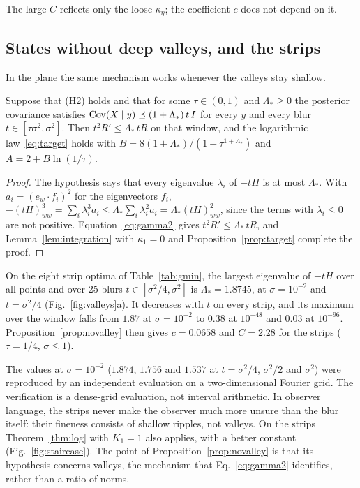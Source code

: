 The large $C$ reflects only the loose $\kappa_\eta$; the coefficient $c$ does not depend on it.

\subsection{States without deep valleys, and the strips}
\label{sec:novalley}

In the plane the same mechanism works whenever the valleys stay shallow.

\begin{proposition}
\label{prop:novalley}
Suppose that (H2) holds and that for some $\tau \in (0,1)$ and $\Lambda_* \geq 0$ the posterior covariance satisfies $\operatorname{Cov}(X\mid y) \preceq (1 + \Lambda_*)\,t\,I$ for every $y$ and every blur $t \in [\tau\sigma^2, \sigma^2]$. Then $t^2R' \leq \Lambda_*\,tR$ on that window, and the logarithmic law~\eqref{eq:target} holds with $B = 8(1+\Lambda_*)/(1 - \tau^{1+\Lambda_*})$ and $A = 2 + B\ln(1/\tau)$.
\end{proposition}

\begin{proof}
The hypothesis says that every eigenvalue $\lambda_i$ of $-tH$ is at most $\Lambda_*$. With $a_i = (e_w\cdot f_i)^2$ for the eigenvectors $f_i$, $-(tH)^3_{ww} = \sum_i\lambda_i^3 a_i \leq \Lambda_*\sum_i\lambda_i^2a_i = \Lambda_*(tH)^2_{ww}$, since the terms with $\lambda_i \leq 0$ are not positive. Equation~\eqref{eq:gamma2} gives $t^2R' \leq \Lambda_*\,tR$, and Lemma~\ref{lem:integration} with $\kappa_1 = 0$ and Proposition~\ref{prop:target} complete the proof.
\end{proof}

\begin{observation}
\label{obs:novalley}
On the eight strip optima of Table~\ref{tab:gmin}, the largest eigenvalue of $-tH$ over all points and over 25 blurs $t \in [\sigma^2/4, \sigma^2]$ is $\Lambda_* = 1.8745$, at $\sigma = 10^{-2}$ and $t = \sigma^2/4$ (Fig.~\ref{fig:valleys}a). It decreases with $t$ on every strip, and its maximum over the window falls from $1.87$ at $\sigma = 10^{-2}$ to $0.38$ at $10^{-48}$ and $0.03$ at $10^{-96}$. Proposition~\ref{prop:novalley} then gives $c = 0.0658$ and $C = 2.28$ for the strips ($\tau = 1/4$, $\sigma \leq 1$).
\end{observation}

The values at $\sigma = 10^{-2}$ ($1.874$, $1.756$ and $1.537$ at $t = \sigma^2/4$, $\sigma^2/2$ and $\sigma^2$) were reproduced by an independent evaluation on a two-dimensional Fourier grid. The verification is a dense-grid evaluation, not interval arithmetic. In observer language, the strips never make the observer much more unsure than the blur itself: their fineness consists of shallow ripples, not valleys. On the strips Theorem~\ref{thm:log} with $K_1 = 1$ also applies, with a better constant (Fig.~\ref{fig:staircase}). The point of Proposition~\ref{prop:novalley} is that its hypothesis concerns valleys, the mechanism that Eq.~\eqref{eq:gamma2} identifies, rather than a ratio of norms.

